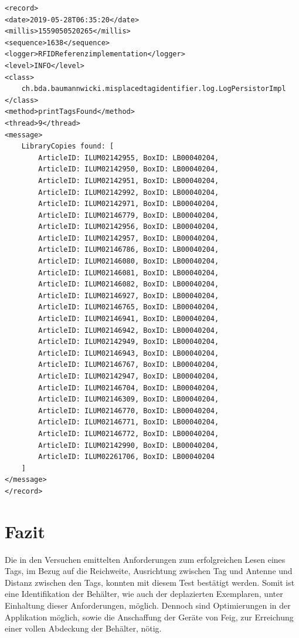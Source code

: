 \documentclass[parskip=full, a4paper]{scrartcl}
\begin{document}
\begin{lstlisting}
<record>
<date>2019-05-28T06:35:20</date>
<millis>1559050520265</millis>
<sequence>1638</sequence>
<logger>RFIDReferenzimplementation</logger>
<level>INFO</level>
<class>
	ch.bda.baumannwicki.misplacedtagidentifier.log.LogPersistorImpl
</class>
<method>printTagsFound</method>
<thread>9</thread>
<message>
	LibraryCopies found: [
		ArticleID: ILUM02142955, BoxID: LB00040204,
		ArticleID: ILUM02142950, BoxID: LB00040204,
		ArticleID: ILUM02142951, BoxID: LB00040204,
		ArticleID: ILUM02142992, BoxID: LB00040204,
		ArticleID: ILUM02142971, BoxID: LB00040204,
		ArticleID: ILUM02146779, BoxID: LB00040204,
		ArticleID: ILUM02142956, BoxID: LB00040204,
		ArticleID: ILUM02142957, BoxID: LB00040204,
		ArticleID: ILUM02146786, BoxID: LB00040204,
		ArticleID: ILUM02146080, BoxID: LB00040204,
		ArticleID: ILUM02146081, BoxID: LB00040204,
		ArticleID: ILUM02146082, BoxID: LB00040204,
		ArticleID: ILUM02146927, BoxID: LB00040204,
		ArticleID: ILUM02146765, BoxID: LB00040204,
		ArticleID: ILUM02146941, BoxID: LB00040204,
		ArticleID: ILUM02146942, BoxID: LB00040204,
		ArticleID: ILUM02142949, BoxID: LB00040204,
		ArticleID: ILUM02146943, BoxID: LB00040204,
		ArticleID: ILUM02146767, BoxID: LB00040204,
		ArticleID: ILUM02142947, BoxID: LB00040204,
		ArticleID: ILUM02146704, BoxID: LB00040204,
		ArticleID: ILUM02146309, BoxID: LB00040204,
		ArticleID: ILUM02146770, BoxID: LB00040204,
		ArticleID: ILUM02146771, BoxID: LB00040204,
		ArticleID: ILUM02146772, BoxID: LB00040204,
		ArticleID: ILUM02142990, BoxID: LB00040204,
		ArticleID: ILUM02261706, BoxID: LB00040204
	]
</message>
</record>
\end{lstlisting}

\section{Fazit}
Die in den Versuchen emittelten Anforderungen zum erfolgreichen Lesen eines Tags, im Bezug auf die Reichweite, Ausrichtung zwischen Tag und Antenne und Distanz zwischen den Tags, konnten mit diesem Test bestätigt werden. Somit ist eine Identifikation der Behälter, wie auch der deplazierten Exemplaren, unter Einhaltung dieser Anforderungen, möglich. Dennoch sind Optimierungen in der Applikation möglich, sowie die Anschaffung der Geräte von Feig, zur Erreichung einer vollen Abdeckung der Behälter, nötig.
\end{document}
